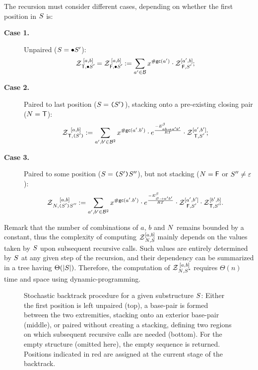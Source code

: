 The recursion must consider different cases, depending on whether the first position in $\Struct$ is:
\begin{description}
\item[{\bf Case 1.}] Unpaired ($\Struct = \ub \Struct'$):
\begin{align}
	\Z{\BoolTrue,\ub \Struct'}{a,b} = \Z{\BoolFalse,\ub \Struct'}{a,b}  &:=
      \sum_{a'\in \B}  
      x^{\gc(a')}
      \cdot\Z{\BoolFalse,\Struct'}{a',b}; 
\label{eq:Z_unpaired}
\end{align}
\item[{\bf Case 2.}] Paired to last position ($\Struct = \op \Struct' \cp$), stacking onto a pre-existing closing pair ($\N=\BoolTrue$):
\begin{align}
	\Z{\BoolTrue,\op \Struct' \cp}{a,b} &:=
      \sum_{a',b'\in \B^2}
			 x^{\gc(a'.b')}
			 \cdot e^{\frac{-\ES^{\beta}_{ab \to a'b'}}{RT}}
			 \cdot \Z{\BoolTrue,\Struct'}{a',b'};
\label{eq:Z_stack}
\end{align}
\item[{\bf Case 3.}] Paired to some position ($\Struct = \op \Struct' \cp \Struct''$), but not stacking ($\N=\BoolFalse$ or $\Struct''\neq \varepsilon$):
\begin{align}
	\Z{\N,\op \Struct' \cp \Struct''}{a,b} &:=
			 \displaystyle
      \sum_{a',b'\in \B^2}
      x^{\gc(a'.b')}
			\cdot e^{\frac{-\ES^{\beta}_{\varnothing\to a'b'}}{RT}}
      \cdot\Z{\BoolFalse,\Struct'}{a',b'}
      \cdot\Z{\BoolTrue,\Struct''}{b',b}.
\label{eq:Z_rec}
\end{align}
\end{description}

Remark that the number of combinations of $a$, $b$ and $\N$ remains bounded by a constant, thus the complexity of computing $\Z{\N,\Struct}{a,b}$ mainly depends on the values taken by $\Struct$ upon subsequent recursive calls. Such values are entirely determined by $\Struct$ at any given step of the recursion, and their dependency can be summarized in a tree having $\Theta(|\Struct|)$. Therefore, the computation of $\Z{\N,\Target}{a,b}$ requires $\Theta(n)$ time and space using dynamic-programming.

\begin{figure*}
\resizebox{\textwidth}{!}{}
\caption{Stochastic backtrack procedure for a given substructure $\Struct$: Either the first position is left unpaired (top), a base-pair is formed between the two extremities, stacking onto an exterior base-pair (middle), or paired without creating a stacking, defining two regions on which subsequent recursive calls are needed (bottom). For the empty structure (omitted here), the empty sequence is returned. Positions indicated in red are assigned at the current stage of the backtrack.\label{fig:stochastic}}
\end{figure*}

